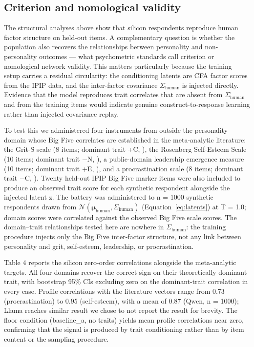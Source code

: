 \documentclass[11pt]{article}
\begin{document}
\subsection{Criterion and nomological validity}

The structural analyses above show that silicon respondents reproduce human factor structure on held-out items. A complementary question is whether the population also recovers the relationships between personality and non-personality outcomes — what psychometric standards call criterion or nomological network validity. This matters particularly because the training setup carries a residual circularity: the conditioning latents are CFA factor scores from the IPIP data, and the inter-factor covariance $\Sigma_{\text{human}}$ is injected directly. Evidence that the model reproduces trait correlates that are absent from $\Sigma_{\text{human}}$ and from the training items would indicate genuine construct-to-response learning rather than injected covariance replay.

To test this we administered four instruments from outside the personality domain whose Big Five correlates are established in the meta-analytic literature: the Grit-S scale (8 items; dominant trait +C, \citep{duckworth2009}), the Rosenberg Self-Esteem Scale (10 items; dominant trait $-$N, \citep{robins2001}), a public-domain leadership emergence measure (10 items; dominant trait +E, \citep{judge2002}), and a procrastination scale (8 items; dominant trait $-$C, \citep{steel2007}). Twenty held-out IPIP Big Five marker items were also included to produce an observed trait score for each synthetic respondent alongside the injected latent z. The battery was administered to n = 1000 synthetic respondents drawn from $\mathcal{N}(\boldsymbol{\mu}_{\text{human}}, \Sigma_{\text{human}})$ (Equation~\ref{eq:latents}) at T = 1.0; domain scores were correlated against the observed Big Five scale scores. The domain–trait relationships tested here are nowhere in $\Sigma_{\text{human}}$: the training procedure injects only the Big Five inter-factor structure, not any link between personality and grit, self-esteem, leadership, or procrastination.

Table 4 reports the silicon zero-order correlations alongside the meta-analytic targets. All four domains recover the correct sign on their theoretically dominant trait, with bootstrap 95\% CIs excluding zero on the dominant-trait correlation in every case. Profile correlations with the literature vectors range from 0.73 (procrastination) to 0.95 (self-esteem), with a mean of 0.87 (Qwen, n = 1000); Llama reaches similar result we chose to not report the result for brevity. The floor condition (baseline\_a, no traits) yields mean profile correlations near zero, confirming that the signal is produced by trait conditioning rather than by item content or the sampling procedure.
\end{document}
